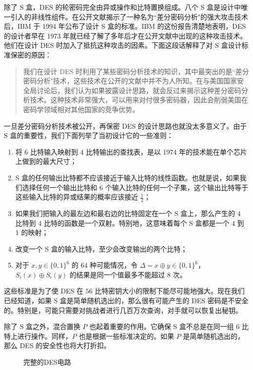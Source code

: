 \begin{snote}
\vspace*{5pt}

\noindent
除了 S 盒，DES 的轮密码完全由异或操作和比特置换组成。八个 S 盒是设计中唯一引入的非线性组件。在公开文献揭示了一种名为``差分密码分析"的强大攻击技术后，IBM 于 1994 年公布了设计 S 盒的标准。IBM 的这份报告清楚地表明，DES 的设计者早在 1973 年就已经了解了多年后才在公开文献中出现的这种攻击技术。他们在设计 DES 时加入了抵抗这种攻击的因素。下面这段话解释了对 S 盒设计标准保密的原因：
\begin{quote}
我们在设计 DES 时利用了某些密码分析技术的知识，其中最突出的是``差分密码分析"技术，这些技术在公开的文献中并不为人所知。在与美国国家安全局讨论后，我们认为如果披露设计思路，就会反过来揭示这种差分密码分析技术。这种技术非常强大，可以用来对付很多密码器，因此会削弱美国在密码学领域相对其他国家的竞争优势。
\end{quote}
一旦差分密码分析技术被公开，再保密 DES 的设计思路也就没太多意义了。由于 S 盒的重要性，我们下面列举了当初设计它的一些准则：
\begin{enumerate}
	\item 将 $6$ 比特输入映射到 $4$ 比特输出的查找表，是以 1974 年的技术能在单个芯片上做到的最大尺寸；
	\item S 盒的任何输出比特都不应该接近于输入比特的线性函数。也就是说，如果我们选择任何一个输出比特和 $6$ 个输入比特的任何一个子集，这个输出比特等于这些输入比特的异或结果的概率应该接近 $\frac{1}{2}$；
	\item 如果我们把输入的最左边和最右边的比特固定在一个 S 盒上，那么产生的 $4$ 比特到 $4$ 比特的函数是一个双射。特别地，这意味着每个 S 盒都是一个 $4$ 到 $1$ 的映射；
	\item 改变一个 S 盒的输入比特，至少会改变输出的两个比特；
	\item 对于 $x,y\in\{0,1\}^6$ 的 $64$ 种可能情况，令 $\Delta=x\oplus y\in\{0,1\}^6$，$S_i(x)\oplus S_i(y)$ 的结果是同一个值最多不能超过 $8$ 次。
\end{enumerate}
这些标准是为了使 DES 在 $56$ 比特密钥大小的限制下能尽可能地强大。现在我们已经知道，如果 S 盒是简单随机选出的，那么很有可能产生的 DES 密码是不安全的。特别是，可能只需要对挑战者进行几百万次查询，对手就可以恢复出秘钥。

除了 S 盒之外，混合置换 $P$ 也起着重要的作用。它确保 S 盒不总是在同一组 $6$ 比特上进行操作。同样，$P$ 也是根据一些标准决定的。如果 $P$ 是简单随机选出的，那么 DES 的安全性也将大打折扣。
\end{snote}

\begin{figure}
  \centering
  
  \caption{完整的DES电路}
  \label{fig:4-9}
\end{figure}

